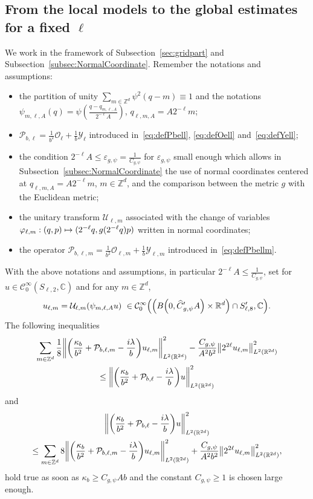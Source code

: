 \documentclass[AHL,Unicode,longabstracts]{cedram}
\newcommand{\C}{\mathbb{C}}
\newcommand{\Z}{\mathbb{Z}}
\newcommand{\R}{\mathbb{R}}
\newcommand{\clC}{\mathcal{C}}
\newcommand{\clY}{\mathcal{Y}}
\newcommand{\clO}{\mathcal{O}}
\newcommand{\clP}{\mathcal{P}}
\newcommand{\clU}{\mathcal{U}}
\newcommand\norm[1]{\left\lVert#1\right\rVert}
\let\oldhat\hat
\renewcommand*{\hat}[1]{\mathchoice{\widehat{#1}}{\widehat{#1}}{\oldhat{#1}}{\oldhat{#1}}}
\let\originalleft\left
\let\originalright\right
\renewcommand{\left}{\mathopen{}\mathclose\bgroup\originalleft}
\renewcommand{\right}{\aftergroup\egroup\originalright}
\let\oldmapsto\mapsto
\renewcommand*{\mapsto}{\mathchoice{\longmapsto}{\oldmapsto}{\oldmapsto}{\oldmapsto}}
\begin{document}
\subsection{From the local models to the global estimates for a fixed \texorpdfstring{$\ell$}{l}}\label{sec:locglobfixedell}
We work in the framework of Subsection~\ref{sec:gridpart} and Subsection~\ref{subsec:NormalCoordinate}. Remember the notations and assumptions:
\begin{itemize}
\item the partition of unity $\sum_{m\in\Z^d}\psi^2(q-m)\equiv 1$ and the notations $\psi_{m,\ell,A}(q)=\psi(\frac{q-q_{m,\ell,A}}{2^{-\ell}A})$, $q_{\ell,m,A}=A2^{-\ell}m$;
\item $\clP_{b,\ell}=\frac{1}{b^2}\clO_{\ell}+\frac{1}{b}\clY_{\ell}$ introduced in~\eqref{eq:defPbell}, \eqref{eq:defOell} and~\eqref{eq:defYell};
\item the condition $2^{-\ell}A\leq \varepsilon_{g,\psi}=\frac{1}{C_{g,\psi}}$ for $\varepsilon_{g,\psi}$ small enough which allows in Subsection~\ref{subsec:NormalCoordinate} the use of normal coordinates centered at $q_{\ell,m,A}=A2^{-\ell}m$, $m\in\Z^d$, and the comparison between the metric $g$ with the Euclidean metric;
\item the unitary transform $\clU_{\ell,m}$ associated with the change of variables $ \varphi_{\ell,m} : (q,p) \mapsto
(2^{-\ell}q,g(2^{-\ell}q)p)$ written in normal coordinates;
\item the operator $\clP_{b,\ell,m}=\frac{1}{b^2}\clO_{\ell,m}+\frac{1}{b}\clY_{\ell,m}$ introduced in~\eqref{eq:defPbellm}.
\end{itemize}
\begin{prop}\label{pr:locglobPbell}
With the above notations and assumptions, in particular $2^{-\ell}A\leq \frac{1}{C_{g,\psi}}$, set for $u\in\clC^{\infty}_{0}(S_{\ell,2},\C)$ and for any $m\in \Z^d$,
\[
u_{\ell,m}=\clU_{\ell,m}(\psi_{m,\ell,A}u)~\in \clC^\infty_0\left(\left(B\left(0,\hat{C}'_{g,\psi}A\right)\times \R^d\right)\cap S_{\ell,8}',\C\right).
\]
The following inequalities
\begin{multline*}
\sum_{m\in \Z^d}\frac{1}{8}\left\| \left(\frac{\kappa_{b}}{b^{2}}+\clP_{b,\ell,m} - \frac{i\lambda}{b}\right) u_{\ell,m}\right\|^{2}_{L^2(\R^{2d})}-\frac{C_{g,\psi}}{A^2b^2}\norm{2^{2\ell}u_{\ell,m}}_{L^2(\R^{2d})}^2
\\
\leq
\left\| \left(\frac{\kappa_{b}}{b^{2}}+\clP_{b,\ell} - \frac{i\lambda}{b}\right) u \right\|^{2}_{L^2(\R^{2d})}
\end{multline*}
and
\begin{multline*}
\left\|\left(\frac{\kappa_{b}}{b^{2}}+\clP_{b,\ell} - \frac{i\lambda}{b}\right) u \right\|^{2}_{L^2(\R^{2d})}
\\
\leq \sum_{m\in \Z^d}8\left\| \left(\frac{\kappa_{b}}{b^{2}}+\clP_{b,\ell,m} - \frac{i\lambda}{b}\right) u_{\ell,m}\right\|^{2}_{L^2(\R^{2d})} +\frac{C_{g,\psi}}{A^2b^2}\norm{2^{2\ell}u_{\ell,m}}_{L^2(\R^{2d})}^2,
\end{multline*}
hold true as soon as $\kappa_b\geq C_{g,\psi}Ab$ and the constant $C_{g,\psi}\geq 1$ is chosen large enough.
\end{prop}
\end{document}
